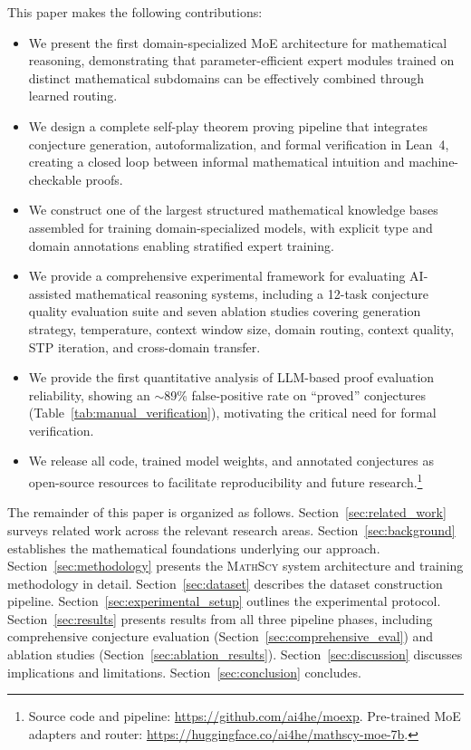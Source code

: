 \documentclass[11pt,a4paper]{article}
\newcommand{\mathscy}{\textsc{MathScy}}
\begin{document}
This paper makes the following contributions:
\begin{itemize}[leftmargin=*]
    \item We present the first domain-specialized MoE architecture for mathematical reasoning, demonstrating that parameter-efficient expert modules trained on distinct mathematical subdomains can be effectively combined through learned routing.
    \item We design a complete self-play theorem proving pipeline that integrates conjecture generation, autoformalization, and formal verification in Lean~4, creating a closed loop between informal mathematical intuition and machine-checkable proofs.
    \item We construct one of the largest structured mathematical knowledge bases assembled for training domain-specialized models, with explicit type and domain annotations enabling stratified expert training.
    \item We provide a comprehensive experimental framework for evaluating AI-assisted mathematical reasoning systems, including a 12-task conjecture quality evaluation suite and seven ablation studies covering generation strategy, temperature, context window size, domain routing, context quality, STP iteration, and cross-domain transfer.
    \item We provide the first quantitative analysis of LLM-based proof evaluation reliability, showing an $\sim$89\% false-positive rate on ``proved'' conjectures (Table~\ref{tab:manual_verification}), motivating the critical need for formal verification.
    \item We release all code, trained model weights, and annotated conjectures as open-source resources to facilitate reproducibility and future research.\footnote{Source code and pipeline: \url{https://github.com/ai4he/moexp}. Pre-trained MoE adapters and router: \url{https://huggingface.co/ai4he/mathscy-moe-7b}.}
\end{itemize}

The remainder of this paper is organized as follows. Section~\ref{sec:related_work} surveys related work across the relevant research areas. Section~\ref{sec:background} establishes the mathematical foundations underlying our approach. Section~\ref{sec:methodology} presents the \mathscy{} system architecture and training methodology in detail. Section~\ref{sec:dataset} describes the dataset construction pipeline. Section~\ref{sec:experimental_setup} outlines the experimental protocol. Section~\ref{sec:results} presents results from all three pipeline phases, including comprehensive conjecture evaluation (Section~\ref{sec:comprehensive_eval}) and ablation studies (Section~\ref{sec:ablation_results}). Section~\ref{sec:discussion} discusses implications and limitations. Section~\ref{sec:conclusion} concludes.
\end{document}
